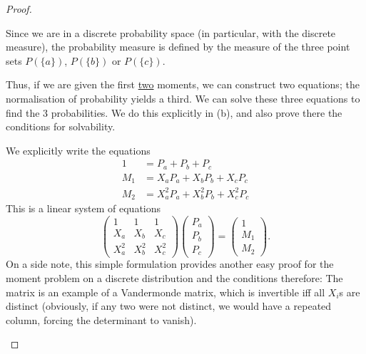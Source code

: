 \begin{proof}
\begin{parts}
\item Since we are in a discrete probability space (in particular, with the discrete measure), the probability measure is defined by the measure of the three point sets $P(\{a\}) $, $P(\{b\} )$ or $P(\{c\} )$.

	Thus, if we are given the first \uline{two} moments, we can construct two equations; the normalisation of probability yields a third. We can solve these three equations to find the 3 probabilities. We do this explicitly in (b), and also prove there the conditions for solvability.
\item We explicitly write the equations
	\begin{align*}
		1 &= P_a + P_b + P_c\\ 
		M_1 &= X_a P_a + X_b P_b + X_c P_c \\
		M_2 &= X_a^2 P_a + X_b^2 P_b + X_c^2 P_c
	\end{align*}
	This is a linear system of equations
	\[
		\begin{pmatrix} 1 & 1 & 1 \\ X_a & X_b & X_c \\ X_a^2 & X_b^2 & X_c^2 \end{pmatrix} \begin{pmatrix}  P_a \\ P_b \\ P_c \end{pmatrix} = \begin{pmatrix} 1 \\ M_1 \\ M_2 \end{pmatrix} 
	.\] 
	On a side note, this simple formulation provides another easy proof for the moment problem on a discrete distribution and the conditions therefore: The matrix is an example of a Vandermonde matrix, which is invertible iff all $X_i$s are distinct (obviously, if any two were not distinct, we would have a repeated column, forcing the determinant to vanish).


\end{parts}
\end{proof}
